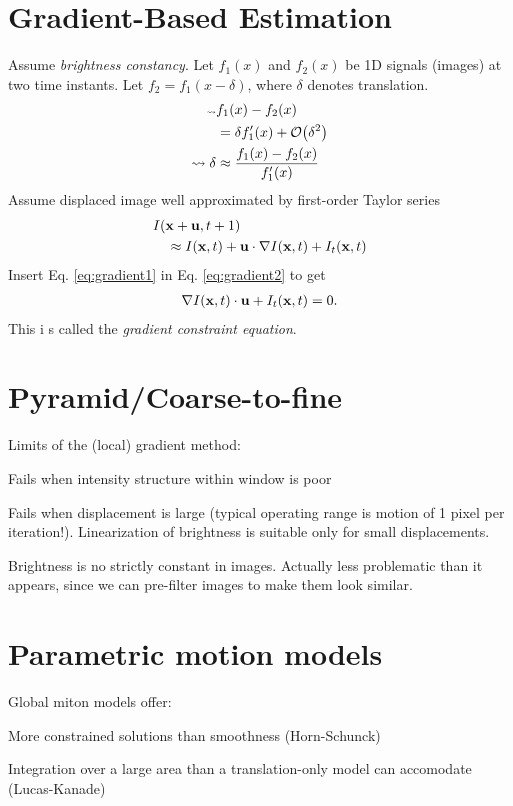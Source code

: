 \begin{compactdesc}
\section{Gradient-Based Estimation}
Assume \emph{brightness constancy}. Let $f_1(x)$ and $f_2(x)$ be 1D signals (images) at two time instants. Let $f_2=f_1(x-\delta)$, where $\delta$ denotes translation.
\begin{align}\scriptscriptstyle
	\mkern-36mu\leadsto &f_1(x)-f_2(x)\nonumber\\
	&=\delta f_1'(x)+\mathcal{O}\!\left( \delta^2 \right)\nonumber\\
	\leadsto \delta &\approx\frac{f_1(x)-f_2(x)}{f_1'(x)}
	\label{eq:gradient1}
\end{align}
Assume displaced image well approximated by first-order Taylor series
\begin{align}
		&I\!\left( \bm{\mathrm{x}}+\bm{\mathrm{u}},t+1 \right)
	\label{eq:gradient2}\\
		&\quad\approx I(\bm{\mathrm{x}},t)+\bm{\mathrm{u}}\cdot \nabla I(\bm{\mathrm{x}},t)+I_t(\bm{\mathrm{x}},t)\nonumber
\end{align}
Insert Eq. \ref{eq:gradient1} in Eq. \ref{eq:gradient2} to get
\begin{gather*}
	\nabla I(\bm{\mathrm{x}},t)\cdot\bm{\mathrm{u}}+I_t(\bm{\mathrm{x}},t)=0.
\end{gather*}
This i s called the \emph{gradient constraint equation}.
\section{Pyramid/Coarse-to-fine}
Limits of the (local) gradient method:
\begin{enumerate*}[label=\protect\circled{\arabic*},itemjoin=]
	\item Fails when intensity structure within window is poor\\
	\item Fails when displacement is large (typical operating range is motion of 1 pixel per iteration!). Linearization of brightness is suitable only for small displacements. \\
	\item Brightness is no strictly constant in images. Actually less problematic than it appears, since we can pre-filter images to make them look similar.\\
\end{enumerate*}
\section{Parametric motion models}
Global miton models offer:\\
\begin{enumerate*}[label=\protect\circled{\arabic*},itemjoin=]
	\item More constrained solutions than smoothness (Horn-Schunck)\\
	\item Integration over a large area than a translation-only model can accomodate (Lucas-Kanade)
\end{enumerate*}
\end{compactdesc}
